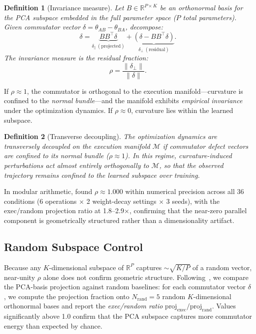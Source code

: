 \documentclass[11pt]{article}
\newcommand{\R}{\mathbb{R}}
\newcommand{\norm}[1]{\lVert #1 \rVert}
\newtheorem{definition}{Definition}
\begin{document}
\begin{definition}[Invariance measure]
Let $B \in \R^{P \times K}$ be an orthonormal basis for the PCA subspace embedded in the full parameter space ($P$ total parameters). Given commutator vector $\delta = \theta_{AB} - \theta_{BA}$, decompose:
\begin{equation}
  \delta = \underbrace{B B^\top \delta}_{\delta_\parallel\ (\text{projected})} + \underbrace{(\delta - B B^\top \delta)}_{\delta_\perp\ (\text{residual})}.
  \label{eq:projection}
\end{equation}
The \emph{invariance measure} is the residual fraction:
\begin{equation}
  \rho = \frac{\norm{\delta_\perp}}{\norm{\delta}}.
  \label{eq:invariance}
\end{equation}
\end{definition}

If $\rho \approx 1$, the commutator is orthogonal to the execution manifold---curvature is confined to the \emph{normal bundle}---and the manifold exhibits \emph{empirical invariance} under the optimization dynamics. If $\rho \approx 0$, curvature lies within the learned subspace.

\begin{definition}[Transverse decoupling]
The optimization dynamics are \emph{transversely decoupled} on the execution manifold $\mathcal{M}$ if commutator defect vectors are confined to its normal bundle ($\rho \approx 1$). In this regime, curvature-induced perturbations act almost entirely orthogonally to $\mathcal{M}$, so that the observed trajectory remains confined to the learned subspace over training.
\end{definition}

In modular arithmetic, \citet{xu2026integrability} found $\rho \approx 1.000$ within numerical precision across all 36 conditions (6 operations $\times$ 2 weight-decay settings $\times$ 3 seeds), with the exec/random projection ratio at 1.8--2.9$\times$, confirming that the near-zero parallel component is geometrically structured rather than a dimensionality artifact.

\subsection{Random Subspace Control}

Because any $K$-dimensional subspace of $\R^P$ captures $\sim \sqrt{K/P}$ of a random vector, near-unity $\rho$ alone does not confirm geometric structure. Following~\citet{xu2026integrability}, we compare the PCA-basis projection against random baselines: for each commutator vector $\delta$, we compute the projection fraction onto $N_{\text{rand}} = 5$ random $K$-dimensional orthonormal bases and report the \emph{exec/random ratio} $\text{proj}_{\text{exec}} / \text{proj}_{\text{rand}}$. Values significantly above 1.0 confirm that the PCA subspace captures more commutator energy than expected by chance.
\end{document}
